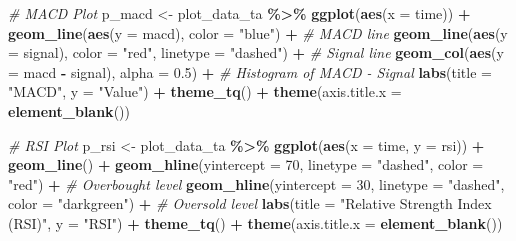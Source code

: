 \documentclass[
]{article}
\newenvironment{Shaded}{\begin{snugshade}}{\end{snugshade}}
\newcommand{\AttributeTok}[1]{\textcolor[rgb]{0.13,0.29,0.53}{#1}}
\newcommand{\CommentTok}[1]{\textcolor[rgb]{0.56,0.35,0.01}{\textit{#1}}}
\newcommand{\DecValTok}[1]{\textcolor[rgb]{0.00,0.00,0.81}{#1}}
\newcommand{\FloatTok}[1]{\textcolor[rgb]{0.00,0.00,0.81}{#1}}
\newcommand{\FunctionTok}[1]{\textcolor[rgb]{0.13,0.29,0.53}{\textbf{#1}}}
\newcommand{\NormalTok}[1]{#1}
\newcommand{\OtherTok}[1]{\textcolor[rgb]{0.56,0.35,0.01}{#1}}
\newcommand{\SpecialCharTok}[1]{\textcolor[rgb]{0.81,0.36,0.00}{\textbf{#1}}}
\newcommand{\StringTok}[1]{\textcolor[rgb]{0.31,0.60,0.02}{#1}}
\begin{document}
\begin{Shaded}
\begin{Highlighting}[]
\CommentTok{\# MACD Plot}
\NormalTok{p\_macd }\OtherTok{\textless{}{-}}\NormalTok{ plot\_data\_ta }\SpecialCharTok{\%\textgreater{}\%}
  \FunctionTok{ggplot}\NormalTok{(}\FunctionTok{aes}\NormalTok{(}\AttributeTok{x =}\NormalTok{ time)) }\SpecialCharTok{+}
  \FunctionTok{geom\_line}\NormalTok{(}\FunctionTok{aes}\NormalTok{(}\AttributeTok{y =}\NormalTok{ macd), }\AttributeTok{color =} \StringTok{"blue"}\NormalTok{) }\SpecialCharTok{+}  \CommentTok{\# MACD line}
  \FunctionTok{geom\_line}\NormalTok{(}\FunctionTok{aes}\NormalTok{(}\AttributeTok{y =}\NormalTok{ signal), }\AttributeTok{color =} \StringTok{"red"}\NormalTok{, }\AttributeTok{linetype =} \StringTok{"dashed"}\NormalTok{) }\SpecialCharTok{+} \CommentTok{\# Signal line}
  \FunctionTok{geom\_col}\NormalTok{(}\FunctionTok{aes}\NormalTok{(}\AttributeTok{y =}\NormalTok{ macd }\SpecialCharTok{{-}}\NormalTok{ signal), }\AttributeTok{alpha =} \FloatTok{0.5}\NormalTok{) }\SpecialCharTok{+} \CommentTok{\# Histogram of MACD {-} Signal}
  \FunctionTok{labs}\NormalTok{(}\AttributeTok{title =} \StringTok{"MACD"}\NormalTok{, }\AttributeTok{y =} \StringTok{"Value"}\NormalTok{) }\SpecialCharTok{+}
  \FunctionTok{theme\_tq}\NormalTok{() }\SpecialCharTok{+}
  \FunctionTok{theme}\NormalTok{(}\AttributeTok{axis.title.x =} \FunctionTok{element\_blank}\NormalTok{())}

\CommentTok{\# RSI Plot}
\NormalTok{p\_rsi }\OtherTok{\textless{}{-}}\NormalTok{ plot\_data\_ta }\SpecialCharTok{\%\textgreater{}\%}
  \FunctionTok{ggplot}\NormalTok{(}\FunctionTok{aes}\NormalTok{(}\AttributeTok{x =}\NormalTok{ time, }\AttributeTok{y =}\NormalTok{ rsi)) }\SpecialCharTok{+}
  \FunctionTok{geom\_line}\NormalTok{() }\SpecialCharTok{+}
  \FunctionTok{geom\_hline}\NormalTok{(}\AttributeTok{yintercept =} \DecValTok{70}\NormalTok{, }\AttributeTok{linetype =} \StringTok{"dashed"}\NormalTok{, }\AttributeTok{color =} \StringTok{"red"}\NormalTok{) }\SpecialCharTok{+}  \CommentTok{\# Overbought level}
  \FunctionTok{geom\_hline}\NormalTok{(}\AttributeTok{yintercept =} \DecValTok{30}\NormalTok{, }\AttributeTok{linetype =} \StringTok{"dashed"}\NormalTok{, }\AttributeTok{color =} \StringTok{"darkgreen"}\NormalTok{) }\SpecialCharTok{+} \CommentTok{\# Oversold level}
  \FunctionTok{labs}\NormalTok{(}\AttributeTok{title =} \StringTok{"Relative Strength Index (RSI)"}\NormalTok{, }\AttributeTok{y =} \StringTok{"RSI"}\NormalTok{) }\SpecialCharTok{+}
  \FunctionTok{theme\_tq}\NormalTok{() }\SpecialCharTok{+}
  \FunctionTok{theme}\NormalTok{(}\AttributeTok{axis.title.x =} \FunctionTok{element\_blank}\NormalTok{())}


\end{Highlighting}
\end{Shaded}
\end{document}
